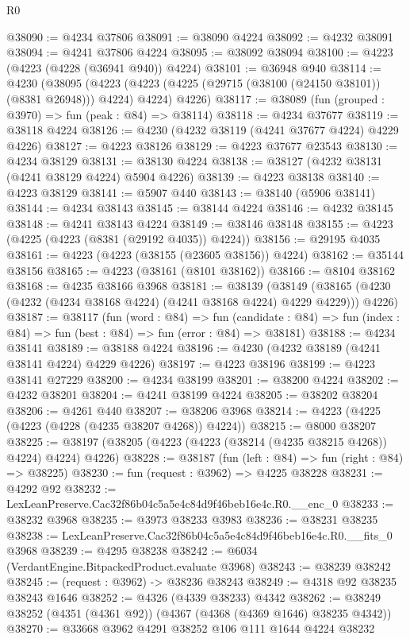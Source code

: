 \begin{lexlean}{R0}
\begin{coremodule}
@38090 := @4234 @37806
@38091 := @38090 @4224
@38092 := @4232 @38091
@38094 := @4241 @37806 @4224
@38095 := @38092 @38094
@38100 := @4223 (@4223 (@4228 (@36941 @940)) @4224)
@38101 := @36948 @940
@38114 := @4230
    (@38095
      (@4223 (@4223 (@4225 (@29715 (@38100 (@24150 @38101)) (@8381 @26948))) @4224) @4224)
      @4226)
@38117 := @38089 (fun (grouped : @3970) => fun (peak : @84) => @38114)
@38118 := @4234 @37677
@38119 := @38118 @4224
@38126 := @4230 (@4232 @38119 (@4241 @37677 @4224) @4229 @4226)
@38127 := @4223 @38126
@38129 := @4223 @37677 @23543
@38130 := @4234 @38129
@38131 := @38130 @4224
@38138 := @38127 (@4232 @38131 (@4241 @38129 @4224) @5904 @4226)
@38139 := @4223 @38138
@38140 := @4223 @38129
@38141 := @5907 @440
@38143 := @38140 (@5906 @38141)
@38144 := @4234 @38143
@38145 := @38144 @4224
@38146 := @4232 @38145
@38148 := @4241 @38143 @4224
@38149 := @38146 @38148
@38155 := @4223 (@4225 (@4223 (@8381 (@29192 @4035)) @4224))
@38156 := @29195 @4035
@38161 := @4223 (@4223 (@38155 (@23605 @38156)) @4224)
@38162 := @35144 @38156
@38165 := @4223 (@38161 (@8101 @38162))
@38166 := @8104 @38162
@38168 := @4235 @38166 @3968
@38181 := @38139
    (@38149 (@38165 (@4230 (@4232 (@4234 @38168 @4224) (@4241 @38168 @4224) @4229 @4229))) @4226)
@38187 := @38117
    (fun (word : @84) =>
    fun (candidate : @84) => fun (index : @84) => fun (best : @84) => fun (error : @84) => @38181)
@38188 := @4234 @38141
@38189 := @38188 @4224
@38196 := @4230 (@4232 @38189 (@4241 @38141 @4224) @4229 @4226)
@38197 := @4223 @38196
@38199 := @4223 @38141 @27229
@38200 := @4234 @38199
@38201 := @38200 @4224
@38202 := @4232 @38201
@38204 := @4241 @38199 @4224
@38205 := @38202 @38204
@38206 := @4261 @440
@38207 := @38206 @3968
@38214 := @4223 (@4225 (@4223 (@4228 (@4235 @38207 @4268)) @4224))
@38215 := @8000 @38207
@38225 := @38197 (@38205 (@4223 (@4223 (@38214 (@4235 @38215 @4268)) @4224) @4224) @4226)
@38228 := @38187 (fun (left : @84) => fun (right : @84) => @38225)
@38230 := fun (request : @3962) => @4225 @38228
@38231 := @4292 @92
@38232 := LexLeanPreserve.Cac32f86b04c5a5e4c84d9f46beb16e4c.R0.__enc_0
@38233 := @38232 @3968
@38235 := @3973 @38233 @3983
@38236 := @38231 @38235
@38238 := LexLeanPreserve.Cac32f86b04c5a5e4c84d9f46beb16e4c.R0.__fits_0 @3968
@38239 := @4295 @38238
@38242 := @6034 (VerdantEngine.BitpackedProduct.evaluate @3968)
@38243 := @38239 @38242
@38245 := (request : @3962) -> @38236 @38243
@38249 := @4318 @92 @38235 @38243 @1646
@38252 := @4326 (@4339 @38233) @4342
@38262 := @38249 @38252 (@4351 (@4361 @92)) (@4367 (@4368 (@4369 @1646) @38235 @4342))
@38270 := @33668 @3962 @4291 @38252 @106 @111 @1644 @4224 @38232

\end{coremodule}
\end{lexlean}
